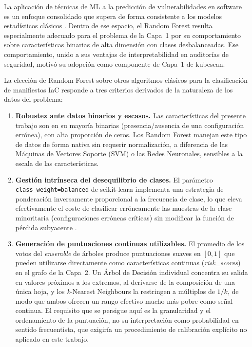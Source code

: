 La aplicación de técnicas de \ac{ML} a la predicción de
vulnerabilidades en software es un enfoque consolidado que supera de forma
consistente a los modelos estadísticos clásicos \citep{Jabeen2022}. Dentro de ese
espacio, el Random Forest resulta especialmente adecuado para el problema
de la Capa~1 por su comportamiento sobre características binarias de alta dimensión
con clases desbalanceadas. Ese comportamiento, unido a sus ventajas de
interpretabilidad en auditorías de seguridad, motivó su adopción como componente
de Capa~1 de kubescan.

La elección de Random Forest sobre otros algoritmos clásicos para la
clasificación de manifiestos \ac{IaC} responde a tres criterios derivados de la
naturaleza de los datos del problema:

\begin{enumerate}
  \item \textbf{Robustez ante datos binarios y escasos.} Las características del
    presente trabajo son en su mayoría binarias (presencia/ausencia de una
    configuración errónea), con alta proporción de ceros. Los Random Forest
    manejan este tipo de datos de forma nativa sin requerir normalización, a diferencia
    de las Máquinas de Vectores Soporte (\acs{SVM}) o las Redes Neuronales, sensibles
    a la escala de las características.

  \item \textbf{Gestión intrínseca del desequilibrio de clases.} El parámetro
    \texttt{class\_weight=balanced} de scikit-learn implementa una estrategia
    de ponderación inversamente proporcional a la frecuencia de clase, lo que eleva
    efectivamente el coste de clasificar erróneamente las muestras de la clase
    minoritaria (configuraciones erróneas críticas) sin modificar la función de pérdida
    subyacente \citep{Pedregosa2011}.

  \item \textbf{Generación de puntuaciones continuas utilizables.} El promedio de
    los votos del \textit{ensemble} de árboles produce puntuaciones suaves en
    \([0,1]\) que pueden utilizarse directamente como características continuas
    (\textit{risk\_scores}) en el grafo de la Capa~2. Un Árbol de Decisión
    individual concentra su salida en valores próximos a los extremos, al derivarse
    de la composición de una única hoja, y los \textit{k}-Nearest Neighbours la
    restringen a múltiplos de \(1/k\), de modo que ambos ofrecen un rango efectivo
    mucho más pobre como señal continua. El requisito que se persigue aquí es la
    granularidad y el ordenamiento de la puntuación, no su interpretación como
    probabilidad en sentido frecuentista, que exigiría un procedimiento de
    calibración explícito no aplicado en este trabajo.
\end{enumerate}

